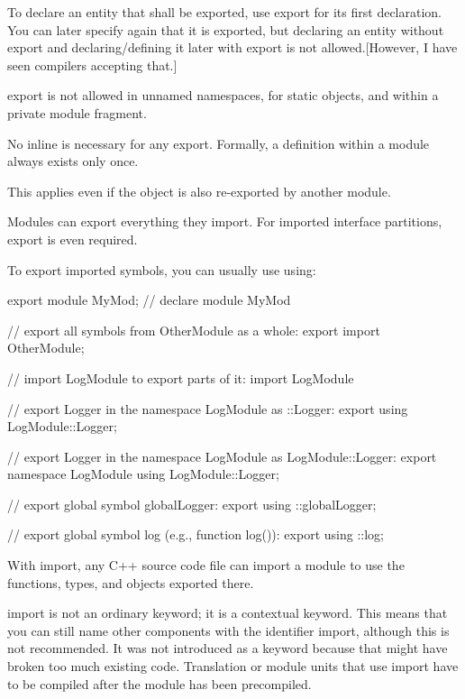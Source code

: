 To declare an entity that shall be exported, use export for its first declaration. You can later specify again that it is exported, but declaring an entity without export and declaring/defining it later with export is not allowed.[However, I have seen compilers accepting that.]

export is not allowed in unnamed namespaces, for static objects, and within a private module fragment.

No inline is necessary for any export. Formally, a definition within a module always exists only once.

This applies even if the object is also re-exported by another module.


Modules can export everything they import. For imported interface partitions, export is even required.

To export imported symbols, you can usually use using:

\begin{cpp}
export module MyMod; // declare module MyMod

// export all symbols from OtherModule as a whole:
export import OtherModule;

// import LogModule to export parts of it:
import LogModule

// export Logger in the namespace LogModule as ::Logger:
export using LogModule::Logger;

// export Logger in the namespace LogModule as LogModule::Logger:
export namespace LogModule {
	using LogModule::Logger;
}

// export global symbol globalLogger:
export using ::globalLogger;

// export global symbol log (e.g., function log()):
export using ::log;
\end{cpp}



With import, any C++ source code file can import a module to use the functions, types, and objects exported there.

import is not an ordinary keyword; it is a contextual keyword. This means that you can still name other components with the identifier import, although this is not recommended. It was not introduced as a keyword because that might have broken too much existing code.
Translation or module units that use import have to be compiled after the module has been precompiled.


